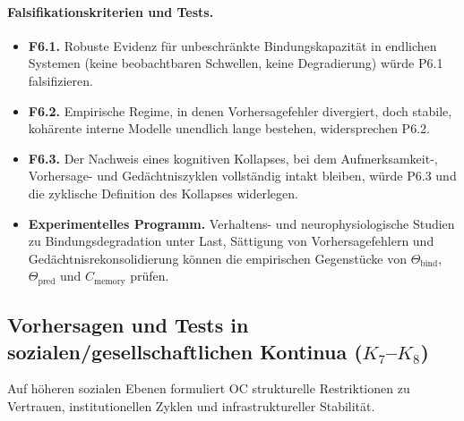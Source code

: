 {\paragraph{Falsifikationskriterien und Tests.}
\begin{itemize}
  \item \textbf{F6.1.}
        Robuste Evidenz für unbeschränkte Bindungskapazität in endlichen Systemen
        (keine beobachtbaren Schwellen, keine Degradierung) würde P6.1 falsifizieren.
  \item \textbf{F6.2.}
        Empirische Regime, in denen Vorhersagefehler divergiert,
doch stabile, kohärente interne Modelle unendlich lange bestehen, widersprechen
        P6.2.
  \item \textbf{F6.3.}
        Der Nachweis eines kognitiven Kollapses, bei dem Aufmerksamkeit-,
        Vorhersage- und Gedächtniszyklen vollständig intakt bleiben,
würde P6.3 und die zyklische Definition des Kollapses widerlegen.
  \item \textbf{Experimentelles Programm.}
        Verhaltens- und neurophysiologische Studien zu Bindungsdegradation
        unter Last, Sättigung von Vorhersagefehlern und Gedächtnisrekonsolidierung
        können die empirischen Gegenstücke von
        \(\Theta_{\mathrm{bind}}\),
        \(\Theta_{\mathrm{pred}}\) und
        \(C_{\mathrm{memory}}\) prüfen.
\end{itemize}

\subsection{Vorhersagen und Tests in sozialen/gesellschaftlichen Kontinua
            (\texorpdfstring{$K_7$}{K\_7}--\texorpdfstring{$K_8$}{K\_8})}

Auf höheren sozialen Ebenen formuliert OC strukturelle Restriktionen zu Vertrauen,
institutionellen Zyklen und infrastruktureller Stabilität.

}
